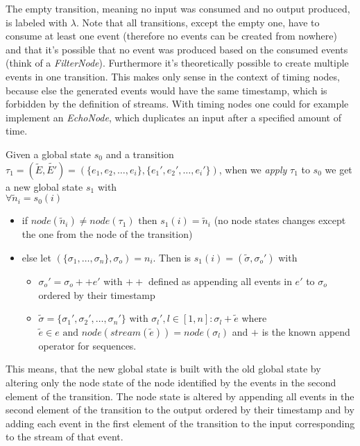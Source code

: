 The empty transition, meaning no input was consumed and no output produced, is labeled with \(\lambda\).
Note that all transitions, except the empty one, have to consume at least one event (therefore no events can be created from nowhere) and that it's possible that no event was produced based on the consumed events (think of a \emph{FilterNode}).
Furthermore it's theoretically possible to create multiple events in one transition.
This makes only sense in the context of timing nodes, because else the generated events would have the same timestamp, which is forbidden by the definition of streams.
With timing nodes one could for example implement an \emph{EchoNode}, which duplicates an input after a specified amount of time.

\begin{definition}[name = Application of a Transition on a State]\label{sec:concepts:def:application_transition}
  Given a global state \(s_0\) and a transition \(\tau_1 = (\widetilde{E}, \widetilde{E'}) = (\{e_1,e_2,\dots,e_i\}, \{e_1',e_2',\dots,e_i'\})\), when we \emph{apply} \(\tau_1\) to \(s_0\) we get a new global state \(s_1\) with\\
  \(\forall \widetilde{n}_i = s_0(i)\)
  \begin{itemize}
    \item if \(\mathit{node}(\widetilde{n}_i) \neq \mathit{node}(\tau_1) \text{ then } s_1(i) = \widetilde{n}_i\) (no node states changes except the one from the node of the transition)
    \item else let \((\{\sigma_1,\dots,\sigma_n\}, \sigma_o) = n_i\). Then is \(s_1(i) = (\widetilde{\sigma}, \sigma_o')\) with
      \begin{itemize}
        \item \(\sigma_o' = \sigma_o ++ e'\) with \(++\) defined as appending all events in \(e'\) to \(\sigma_o\) ordered by their timestamp
        \item \(\widetilde{\sigma} = \{\sigma_1', \sigma_2', \dots, \sigma_n'\}\) with \(\sigma_l', l \in [1,n]: \sigma_l + \widetilde{e}\) where \(\widetilde{e} \in e \text{ and } \mathit{node}(\mathit{stream}(\widetilde{e})) = \mathit{node}(\sigma_l)\) and \(+\) is the known append operator for sequences.
      \end{itemize}
  \end{itemize}

\end{definition}

This means, that the new global state is built with the old global state by altering only the node state of the node identified by the events in the second element of the transition.
The node state is altered by appending all events in the second element of the transition to the output ordered by their timestamp and by adding each event in the first element of the transition to the input corresponding to the stream of that event.

